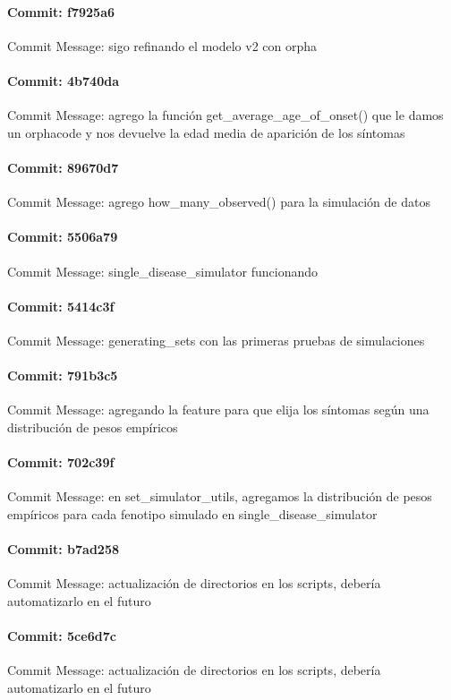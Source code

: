 \documentclass{article}
\begin{document}
\paragraph{Commit: f7925a6}
Commit Message: sigo refinando el modelo v2 con orpha

\paragraph{Commit: 4b740da}
Commit Message: agrego la función get_average_age_of_onset() que le damos un orphacode y nos devuelve la edad media de aparición de los síntomas

\paragraph{Commit: 89670d7}
Commit Message: agrego how_many_observed() para la simulación de datos

\paragraph{Commit: 5506a79}
Commit Message: single_disease_simulator funcionando

\paragraph{Commit: 5414c3f}
Commit Message: generating_sets con las primeras pruebas de simulaciones

\paragraph{Commit: 791b3c5}
Commit Message: agregando la feature para que elija los síntomas según una distribución de pesos empíricos

\paragraph{Commit: 702c39f}
Commit Message: en set_simulator_utils, agregamos la distribución de pesos empíricos para cada fenotipo simulado en single_disease_simulator

\paragraph{Commit: b7ad258}
Commit Message: actualización de directorios en los scripts, debería automatizarlo en el futuro

\paragraph{Commit: 5ce6d7c}
Commit Message: actualización de directorios en los scripts, debería automatizarlo en el futuro
\end{document}
